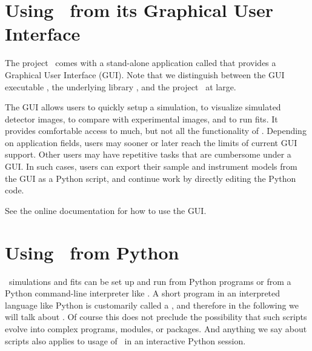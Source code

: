 \section{Using \BornAgain\ from its Graphical User Interface}

The project \BornAgain\ comes with a stand-alone application called 
that provides a Graphical User Interface (GUI).
Note that we distinguish between the GUI executable ,
the underlying library , and the project \BornAgain\ at large.

The GUI allows users to quickly setup a simulation, to visualize simulated
detector images, to compare with experimental images, and to run fits.
It provides comfortable access to much, but not all the functionality
of .
Depending on application fields,
users may sooner or later reach the limits of current GUI support.
Other users may have repetitive tasks that are cumbersome under a GUI.
In such cases, users can export their sample and instrument models from
the GUI as a Python script,
and continue work by directly editing the Python code.

See the online documentation for
 how to use the GUI.

\section{Using \BornAgain\ from Python}

\BornAgain\ simulations and fits can be set up and run from Python programs
or from a Python command-line interpreter like .
A short program in an interpreted language like Python is customarily called
a ,
and therefore in the following we will talk about .
Of course this does not preclude the possibility that such scripts evolve into
complex programs, modules, or packages.
And anything we say about scripts also applies to usage of \BornAgain\ in an
interactive Python session.%
%
%

